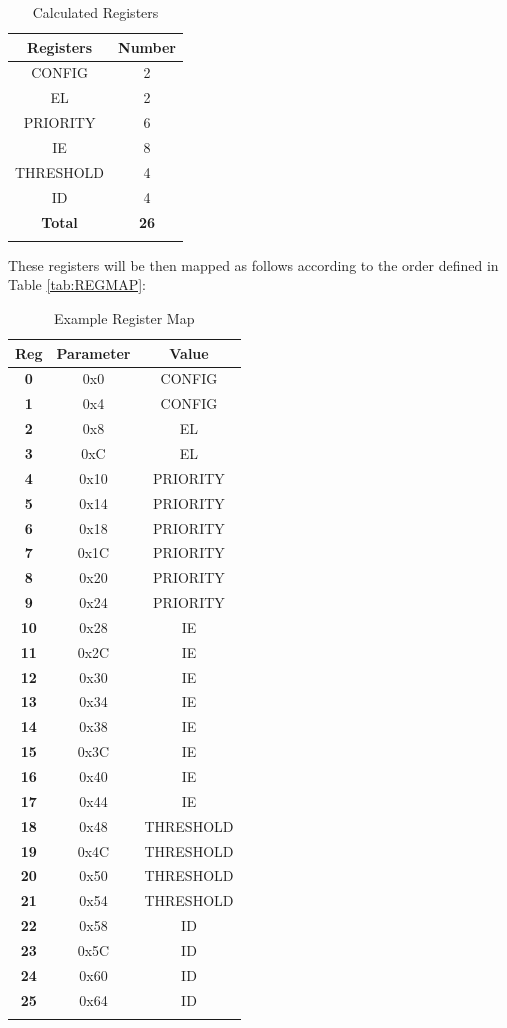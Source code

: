\begin{longtable}[c]{@{}cc@{}}	
		\toprule 
		\textbf{Registers} & \textbf{Number}\\
		\midrule 
		\endhead
		CONFIG & 2\\
		EL & 2\\
		PRIORITY & 6\\
		IE & 8\\
		THRESHOLD & 4\\
		ID & 4\\
		\midrule
		\textbf{Total} & \textbf{26}\\
		\bottomrule 	
	\caption{Calculated Registers}
	\label{tab:REGMAPNUM}
\end{longtable}


These registers will be then mapped as follows according to the order
defined in Table \ref{tab:REGMAP}:

\begin{longtable}[c]{ccc}	
		\toprule 
		\textbf{Reg} & \textbf{Parameter} & \textbf{Value}\\
		\midrule 
		\endhead
		\textbf{0}  & 0x0  & CONFIG\\
		\textbf{1}  & 0x4  & CONFIG\\
		\textbf{2}  & 0x8  & EL\\
		\textbf{3}  & 0xC  & EL\\
		\textbf{4}  & 0x10 & PRIORITY\\
		\textbf{5}  & 0x14 & PRIORITY\\
		\textbf{6}  & 0x18 & PRIORITY\\
		\textbf{7}  & 0x1C & PRIORITY\\
		\textbf{8}  & 0x20 & PRIORITY\\
		\textbf{9}  & 0x24 & PRIORITY\\
		\textbf{10} & 0x28 & IE\\
		\textbf{11} & 0x2C & IE\\
		\textbf{12} & 0x30 & IE\\
		\textbf{13} & 0x34 & IE\\
		\textbf{14} & 0x38 & IE\\
		\textbf{15} & 0x3C & IE\\
		\textbf{16} & 0x40 & IE\\
		\textbf{17} & 0x44 & IE\\
		\textbf{18} & 0x48 & THRESHOLD\\
		\textbf{19} & 0x4C & THRESHOLD\\
		\textbf{20} & 0x50 & THRESHOLD\\
		\textbf{21} & 0x54 & THRESHOLD\\
		\textbf{22} & 0x58 & ID\\
		\textbf{23} & 0x5C & ID\\
		\textbf{24} & 0x60 & ID\\
		\textbf{25} & 0x64 & ID\\
		\bottomrule 	
	\caption{Example Register Map}
	\label{tab:REGMAPRES}
\end{longtable}

